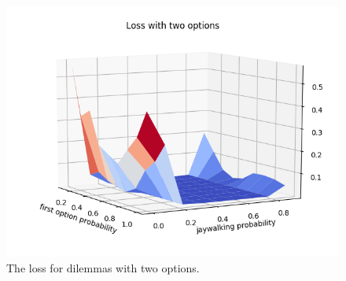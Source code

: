 \documentclass{report}
\begin{document}
\begin{figure}[h]
    \centering
    \includegraphics[scale=0.5]{loss_with_two_options_surface_plot.png}
    \caption[]{The loss for dilemmas with two options.}
    \label{fig:loss_with_two_options_surface_plot}
\end{figure}
\end{document}
